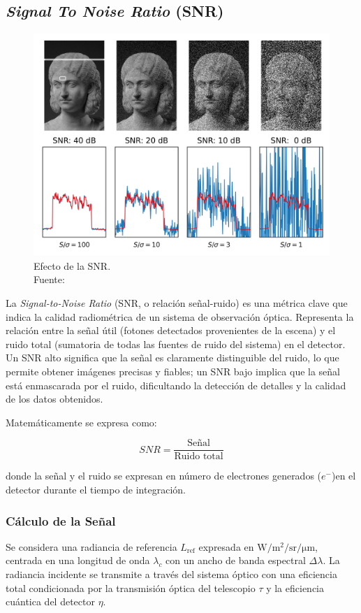 \subsection{\textit{Signal To Noise Ratio} (SNR)}\label{snr}
\begin{figure}[H]
    \centering
    \includegraphics[width=0.5\linewidth]{3.Conceptos_Previos/SNR_image_demonstration.png}
    \caption{Efecto de la SNR.\\ Fuente: \cite{wikipedia2025snr_demonstration}}
    \label{fig:snr}
\end{figure}

La \textit{Signal-to-Noise Ratio} (SNR, o relación señal-ruido) es una métrica clave que indica la calidad radiométrica de un sistema de observación óptica. Representa la relación entre la señal útil (fotones detectados provenientes de la escena) y el ruido total (sumatoria de todas las fuentes de ruido del sistema) en el detector. Un SNR alto significa que la señal es claramente distinguible del ruido, lo que permite obtener imágenes precisas y fiables; un SNR bajo implica que la señal está enmascarada por el ruido, dificultando la detección de detalles y la calidad de los datos obtenidos\cite{design_workshop_optical_2023}\cite{zorita_snr_2023}.

Matemáticamente se expresa como:

\begin{equation}
SNR = \frac{\text{Señal}}{\text{Ruido total}}
\end{equation}

donde la señal y el ruido se expresan en número de electrones generados ($e^-$)en el detector durante el tiempo de integración.

\subsubsection{Cálculo de la Señal}


Se considera una radiancia de referencia \( L_{\mathrm{ref}} \) expresada en \( \si{\watt\per\metre\squared\per\steradian\per\micro\metre} \), centrada en una longitud de onda \( \lambda_c \) con un ancho de banda espectral \( \Delta \lambda \). La radiancia incidente se transmite a través del sistema óptico con una eficiencia total condicionada por la transmisión óptica del telescopio \( \tau \) y la eficiencia cuántica del detector \( \eta \). 

